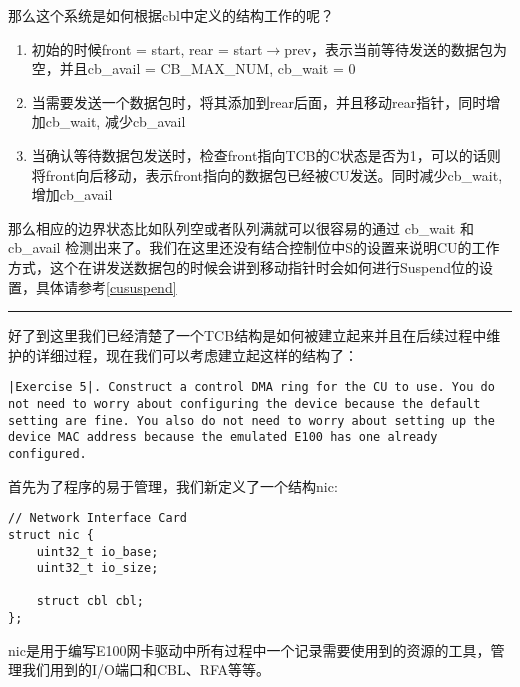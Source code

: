 \documentclass{article}
\begin{document}
\begin{CJK*}{UTF8}{gkai}
\begin{itemize}
{\begin{itemize}
\end{itemize}
}
\end{itemize}

那么这个系统是如何根据cbl中定义的结构工作的呢？

\begin{enumerate}
\item{初始的时候front = start, rear = start$\rightarrow$prev，表示当前等待发送的数据包为空，并且cb\_avail = CB\_MAX\_NUM, cb\_wait = 0}
\item{当需要发送一个数据包时，将其添加到rear后面，并且移动rear指针，同时增加cb\_wait, 减少cb\_avail}
\item{当确认等待数据包发送时，检查front指向TCB的C状态是否为1，可以的话则将front向后移动，表示front指向的数据包已经被CU发送。同时减少cb\_wait, 增加cb\_avail}

\end{enumerate}

那么相应的边界状态比如队列空或者队列满就可以很容易的通过 cb\_wait 和 cb\_avail 检测出来了。我们在这里还没有结合控制位中S的设置来说明CU的工作方式，这个在讲发送数据包的时候会讲到移动指针时会如何进行Suspend位的设置，具体请参考\ref{cususpend}

\vspace{2em}
\hrule
\vspace{2em}

好了到这里我们已经清楚了一个TCB结构是如何被建立起来并且在后续过程中维护的详细过程，现在我们可以考虑建立起这样的结构了：

\begin{lstlisting}[style=exercise]
|Exercise 5|. Construct a control DMA ring for the CU to use. You do not need to worry about configuring the device because the default setting are fine. You also do not need to worry about setting up the device MAC address because the emulated E100 has one already configured.
\end{lstlisting}

首先为了程序的易于管理，我们新定义了一个结构nic:

\begin{lstlisting}[style=ccode, title={\scriptsize \ttfamily \bfseries kern/e100.h}]
// Network Interface Card
struct nic {
    uint32_t io_base;
    uint32_t io_size;

    struct cbl cbl;
};\end{lstlisting}

nic是用于编写E100网卡驱动中所有过程中一个记录需要使用到的资源的工具，管理我们用到的I/O端口和CBL、RFA等等。


\end{CJK*}
\end{document}
